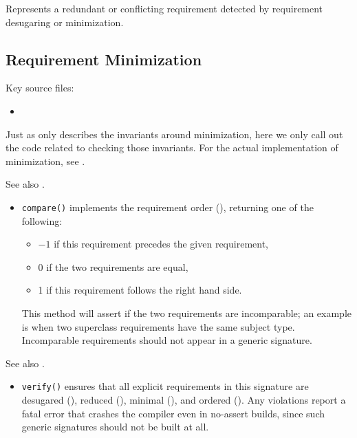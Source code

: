 \documentclass[../generics]{subfiles}
\begin{document}
Represents a redundant or conflicting requirement detected by requirement desugaring or minimization.

\subsection*{Requirement Minimization}

Key source files:
\begin{itemize}
\item {}
\end{itemize}
Just as  only describes the invariants around minimization, here we only call out the code related to checking those invariants. For the actual implementation of minimization, see .

See also .
\begin{itemize}
\item \texttt{compare()} implements the requirement order (), returning one of the following:
\begin{itemize}
\item $-1$ if this requirement precedes the given requirement,
\item 0 if the two requirements are equal,
\item 1 if this requirement follows the right hand side.
\end{itemize}
This method will assert if the two requirements are incomparable; an example is when two superclass requirements have the same subject type. Incomparable requirements should not appear in a generic signature. 
\end{itemize}

See also .
\begin{itemize}
\item \texttt{verify()} ensures that all explicit requirements in this signature are desugared (), reduced (), minimal (), and ordered (). Any violations report a fatal error that crashes the compiler even in no-assert builds, since such generic signatures should not be built at all.
\end{itemize}
\end{document}

